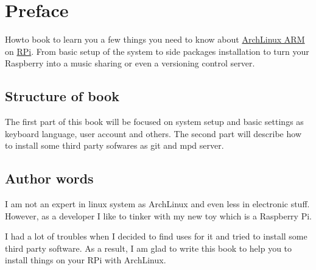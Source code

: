 \chapter*{Preface}
Howto book to learn you a few things you need to know about 
\href{http://archlinuxarm.org/platforms/armv6/raspberry-pi}{ArchLinux ARM} 
on \href{http://www.raspberrypi.org/help/what-is-a-raspberry-pi/}{RPi}. 
From basic setup of the system to side packages installation to turn 
your Raspberry into a music sharing or even a versioning control server.

\section*{Structure of book}
The first part of this book will be focused on system setup and 
basic settings as keyboard language, user account and others. 
The second part will describe how to install some third party sofwares 
as git and mpd server.

\section*{Author words}
I am not an expert in linux system as ArchLinux and even less in electronic 
stuff. However, as a developer I like to tinker with my new toy which is 
a Raspberry Pi. 

I had a lot of troubles when I decided to find uses for it 
and tried to install some third party software. As a result, I am glad to 
write this \og{}book\fg{} to help you to install things on your RPi with ArchLinux.
